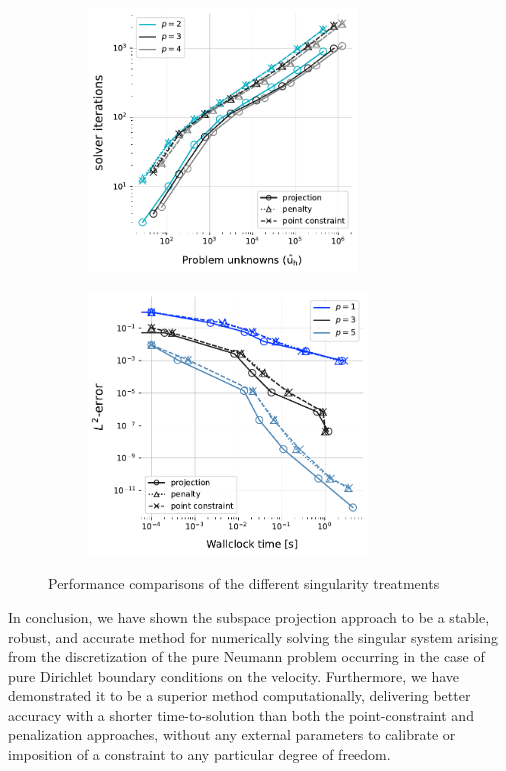 \begin{figure}[ht]
    \centering
    \begin{subfigure}{0.45\textwidth}
        \includegraphics[height=7cm]{img/PNP_solver_iterations.pdf}
    \end{subfigure}
    \begin{subfigure}{0.45\textwidth}
        \includegraphics[height=7cm]{img/PNP_treatment_wall_times.pdf}
    \end{subfigure}
    \caption{Performance comparisons of the different singularity treatments}
    \label{fig:PNP_treatment_performance}
\end{figure}

In conclusion, we have shown the subspace projection approach to be a stable, robust, and accurate method for numerically solving the singular system arising from the discretization of the pure Neumann problem occurring in the case of pure Dirichlet boundary conditions on the velocity.
Furthermore, we have demonstrated it to be a superior method computationally, delivering better accuracy with a shorter time-to-solution than both the point-constraint and penalization approaches, without any external parameters to calibrate or imposition of a constraint to any particular degree of freedom.

